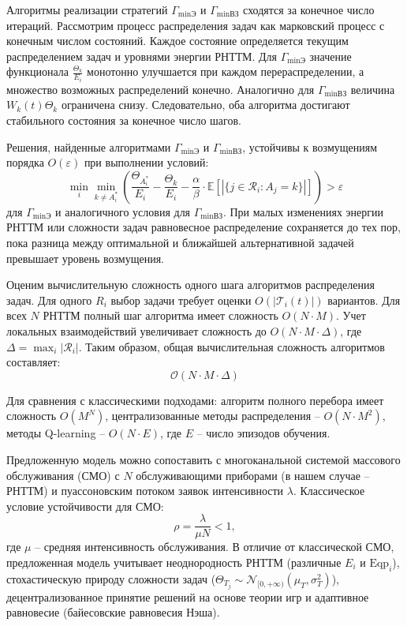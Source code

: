 Алгоритмы реализации стратегий $\Gamma_{\min\text{Э}}$ и $\Gamma_{\min\text{ВЗ}}$ сходятся за конечное число итераций. Рассмотрим процесс распределения задач как марковский процесс с конечным числом состояний. Каждое состояние определяется текущим распределением задач и уровнями энергии РНТТМ. Для $\Gamma_{\min\text{Э}}$ значение функционала $\frac{\Theta_k}{E_i}$ монотонно улучшается при каждом перераспределении, а множество возможных распределений конечно. Аналогично для $\Gamma_{\min\text{ВЗ}}$ величина $W_k(t)\Theta_k$ ограничена снизу. Следовательно, оба алгоритма достигают стабильного состояния за конечное число шагов.

Решения, найденные алгоритмами $\Gamma_{\min\text{Э}}$ и $\Gamma_{\min\text{ВЗ}}$, устойчивы к возмущениям порядка $O(\varepsilon)$ при выполнении условий:
\begin{equation}
	\min_{i} \min_{k \neq A_i^*} \left( \frac{\Theta_{A_i^*}}{E_i} - \frac{\Theta_k}{E_i} - \frac{\alpha}{\beta} \cdot \mathbb{E}[|\{j \in \mathcal{R}_i: A_j = k\}|] \right) > \varepsilon
\end{equation}
для $\Gamma_{\min\text{Э}}$ и аналогичного условия для $\Gamma_{\min\text{ВЗ}}$. При малых изменениях энергии РНТТМ или сложности задач равновесное распределение сохраняется до тех пор, пока разница между оптимальной и ближайшей альтернативной задачей превышает уровень возмущения.

Оценим вычислительную сложность одного шага алгоритмов распределения задач. Для одного $R_i$ выбор задачи требует оценки $O(|\mathcal{T}_i(t)|)$ вариантов. Для всех $N$ РНТТМ полный шаг алгоритма имеет сложность $O(N \cdot M)$. Учет локальных взаимодействий увеличивает сложность до $O(N \cdot M \cdot \Delta)$, где $\Delta = \max_i |\mathcal{R}_i|$. Таким образом, общая вычислительная сложность алгоритмов составляет:
\begin{equation}
\mathcal{O}(N \cdot M \cdot \Delta)
\end{equation}

Для сравнения с классическими подходами: алгоритм полного перебора имеет сложность $O(M^N)$, централизованные методы распределения -- $O(N \cdot M^2)$, методы Q-learning -- $O(N \cdot E)$, где $E$ -- число эпизодов обучения.

Предложенную модель можно сопоставить с многоканальной системой массового обслуживания (СМО) \cite{Pleskunov2022, BushuevaSergeev2022} с $N$ обслуживающими приборами (в нашем случае -- РНТТМ) и пуассоновским потоком заявок интенсивности $\lambda$. Классическое условие устойчивости для СМО:
\begin{equation}
\rho = \frac{\lambda}{\mu N} < 1,
\end{equation}
где $\mu$ -- средняя интенсивность обслуживания. В отличие от классической СМО, предложенная модель учитывает неоднородность РНТТМ (различные $E_i$ и $\text{Eqp}_i$), стохастическую природу сложности задач ($\Theta_{T_j} \sim \mathcal{N}_{[0, +\infty)}(\mu_T, \sigma_T^2)$), децентрализованное принятие решений на основе теории игр и адаптивное равновесие (байесовские равновесия Нэша).

